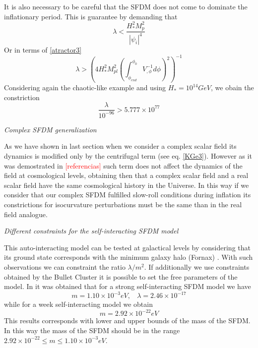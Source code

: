 \documentclass[amssymb,twocolumn,prd,nofootinbib,showpacs]{revtex4-1}
\begin{document}
It is also necessary to be careful that the SFDM does not come to dominate the inflationary period.  This is guarantee by demanding that
\begin{equation}
\lambda < \frac{H_*^2 M_p^2}{|\psi_i|^4}
\end{equation}
Or in terms of \eqref{atractor3}
\begin{equation}
\lambda>\left(4H_*^2M_{pl}^2\left(\int_{\phi_{end}}^{\phi_0}V_{,\phi}^{-1}d\phi\right)^2\right)^{-1}
\end{equation}
Considering again the chaotic-like example and using $H_*= 10^{14} GeV$, we obain the constriction
\begin{equation}\label{lowerlambda}
\frac{\lambda}{10^{-96}} > 5.777\times 10^{77}
\end{equation}
\begin{center}
\textit{Complex SFDM generalization}
\end{center}
As we have shown in last section when we consider a complex scalar field its dynamics is modified only by the centrifugal term (see eq. \eqref{KGe3}). However as it was demostrated in \textcolor{red}{[referencias]} such term does not affect the dynamics of the field at cosmological levels, obtaining then that a complex scalar field and a real scalar field have the same cosmological history in the Universe. In this way if we consider that our complex SFDM fulfilled slow-roll conditions during inflation its constrictions for isocurvature perturbations must be the same than in the real field analogue. \\
\begin{center}
\textit{Different constraints for the self-interacting SFDM model}
\end{center}

This auto-interacting model can be tested at galactical levels by considering that its ground state corresponds with the minimum galaxy halo (Fornax) \cite{SFphi42}. With such observations we can constraint the ratio $\lambda/m^2$. If additionally we use constraints obtained by the Bullet Cluster \cite{bullet} it is possible to set the free parameters of the model. In \cite{SFphi42} it was obtained that for a strong self-interacting SFDM model we have
\begin{equation}
m= 1.10\times10^{-3}eV, \ \ \ \ \lambda = 2.46\times 10^{-17}
\end{equation}
while for a week self-interacting model we obtain
\begin{equation}
m= 2.92\times 10^{-22}eV
\end{equation}
This results corresponds with lower and upper bounds of the mass of the SFDM. In this way the mass of the SFDM should be in the range $2.92\times 10^{-22}\leq m\leq 1.10\times 10^{-3}eV$.
\end{document}
